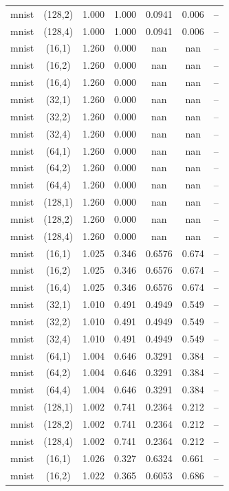 \begin{tabular}{lcccccc}
mnist & (128,2) & 1.000 & 1.000 & 0.0941 & 0.006 & -- \\
mnist & (128,4) & 1.000 & 1.000 & 0.0941 & 0.006 & -- \\
mnist & (16,1) & 1.260 & 0.000 & nan & nan & -- \\
mnist & (16,2) & 1.260 & 0.000 & nan & nan & -- \\
mnist & (16,4) & 1.260 & 0.000 & nan & nan & -- \\
mnist & (32,1) & 1.260 & 0.000 & nan & nan & -- \\
mnist & (32,2) & 1.260 & 0.000 & nan & nan & -- \\
mnist & (32,4) & 1.260 & 0.000 & nan & nan & -- \\
mnist & (64,1) & 1.260 & 0.000 & nan & nan & -- \\
mnist & (64,2) & 1.260 & 0.000 & nan & nan & -- \\
mnist & (64,4) & 1.260 & 0.000 & nan & nan & -- \\
mnist & (128,1) & 1.260 & 0.000 & nan & nan & -- \\
mnist & (128,2) & 1.260 & 0.000 & nan & nan & -- \\
mnist & (128,4) & 1.260 & 0.000 & nan & nan & -- \\
mnist & (16,1) & 1.025 & 0.346 & 0.6576 & 0.674 & -- \\
mnist & (16,2) & 1.025 & 0.346 & 0.6576 & 0.674 & -- \\
mnist & (16,4) & 1.025 & 0.346 & 0.6576 & 0.674 & -- \\
mnist & (32,1) & 1.010 & 0.491 & 0.4949 & 0.549 & -- \\
mnist & (32,2) & 1.010 & 0.491 & 0.4949 & 0.549 & -- \\
mnist & (32,4) & 1.010 & 0.491 & 0.4949 & 0.549 & -- \\
mnist & (64,1) & 1.004 & 0.646 & 0.3291 & 0.384 & -- \\
mnist & (64,2) & 1.004 & 0.646 & 0.3291 & 0.384 & -- \\
mnist & (64,4) & 1.004 & 0.646 & 0.3291 & 0.384 & -- \\
mnist & (128,1) & 1.002 & 0.741 & 0.2364 & 0.212 & -- \\
mnist & (128,2) & 1.002 & 0.741 & 0.2364 & 0.212 & -- \\
mnist & (128,4) & 1.002 & 0.741 & 0.2364 & 0.212 & -- \\
mnist & (16,1) & 1.026 & 0.327 & 0.6324 & 0.661 & -- \\
mnist & (16,2) & 1.022 & 0.365 & 0.6053 & 0.686 & -- \\

\end{tabular}

